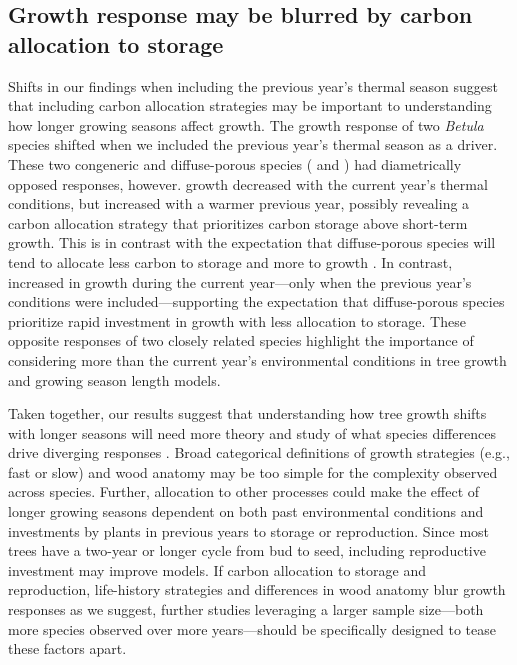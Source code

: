 \subsection{Growth response may be blurred by carbon allocation to storage}
Shifts in our findings when including the previous year's thermal season suggest that including carbon allocation strategies may be important to understanding how longer growing seasons affect growth. The growth response of two \textit{Betula} species shifted when we included the previous year's thermal season as a driver. These two congeneric and diffuse-porous species ({\Ball} and {\Bnig}) had diametrically opposed responses, however. {\Ball} growth decreased with the current year's thermal conditions, but increased with a warmer previous year, possibly revealing a carbon allocation strategy that prioritizes carbon storage above short-term growth. This is in contrast with the expectation that diffuse-porous species will tend to allocate less carbon to storage and more to growth \citep{barbaroux_contrasting_2002,muhr_how_2016}. In contrast, {\Bnig} increased in growth during the current year---only when the previous year's conditions were included---supporting the expectation that diffuse-porous species prioritize rapid investment in growth with less allocation to storage. These opposite responses of two closely related species highlight the importance of considering more than the current year's environmental conditions in tree growth and growing season length models.

Taken together, our results suggest that understanding how tree growth shifts with longer seasons will need more theory and study of what species differences drive diverging responses \citep{cufar_treering_2008,delpierre_temperate_2016,silvestro_longer_2023}. Broad categorical definitions of growth strategies (e.g., fast or slow) and wood anatomy may be too simple for the complexity observed across species. Further, allocation to other processes could make the effect of longer growing seasons dependent on both past environmental conditions and investments by plants in previous years to storage or reproduction. Since most trees have a two-year or longer cycle from bud to seed, including reproductive investment may improve models. If carbon allocation to storage and reproduction, life-history strategies and differences in wood anatomy blur growth responses as we suggest, further studies leveraging a larger sample size---both more species observed over more years---should be specifically designed to tease these factors apart. %
